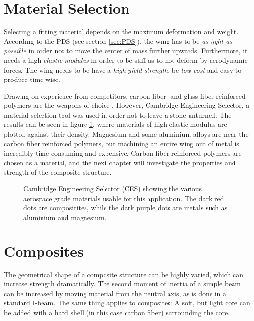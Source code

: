 \section{Material Selection}

  Selecting a fitting material depends on the maximum deformation and weight. According to the PDS (see section \ref{sec:PDS}), the wing has to be \emph{as light as possible} in order not to move the center of mass further upwards. Furthermore, it needs a high \emph{elastic modulus} in order to be stiff as to not deform by aerodynamic forces. The wing needs to be have a \emph{high yield strength}, be \emph{low cost} and easy to produce time wise.

  Drawing on experience from competitors, carbon fiber- and glass fiber reinforced polymers are the weapons of choice \cite{FSwingmaterial}. However, Cambridge Engineering Selector, a material selection tool was used in order not to leave a stone unturned. The results can be seen in figure \ref{fig:CESmatchoice}, where materials of high elastic modulus are plotted against their density. Magnesium and some aluminium alloys are near the carbon fiber reinforced polymers, but machining an entire wing out of metal is incredibly time consuming and expensive. Carbon fiber reinforced polymers are chosen as a material, and the next chapter will investigate the properties and strength of the composite structure.

  \begin{figure}
    \caption{Cambridge Engineering Selector (CES) showing the various aerospace grade materials usable for this application. The dark red dots are compositites, while the dark purple dots are metals such as aluminium and magnesium.}
    \label{fig:CESmatchoice}
  \end{figure}

\section{Composites}

  The geometrical shape of a composite structure can be highly varied, which can increase strength dramatically. The second moment of inertia of a simple beam can be increased by moving material from the neutral axis, as is done in a standard I-beam. The same thing applies to composites: A soft, but light core can be added with a hard shell (in this case carbon fiber) surrounding the core.

